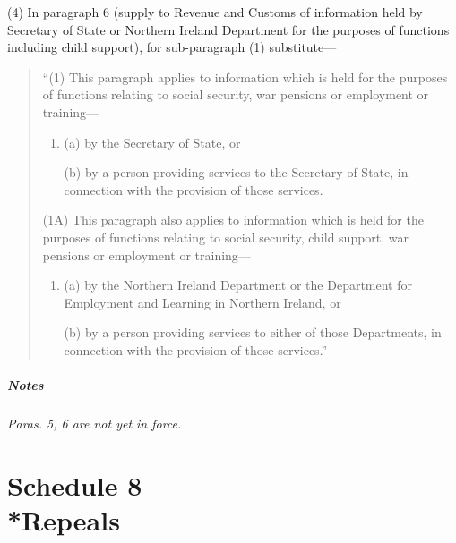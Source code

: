 \documentclass[a4paper]{article}
\newcommand{\parthead}{}
\newcommand\amendment[1]{\subsubsection*{Notes}{\itshape\frenchspacing\footnotesize #1 \par}}
\begin{document}
(4) In paragraph 6 (supply to Revenue and Customs of information held by Secretary of State or Northern Ireland Department for the purposes of functions including child support), for sub-paragraph (1) substitute—
\begin{quotation}
“(1) This paragraph applies to information which is held for the purposes of functions relating to social security, war pensions or employment or training—
\begin{enumerate}\item[]
(a) by the Secretary of State, or

(b) by a person providing services to the Secretary of State, in connection with the provision of those services.
\end{enumerate}

(1A) This paragraph also applies to information which is held for the purposes of functions relating to social security, child support, war pensions or employment or training—
\begin{enumerate}\item[]
(a) by the Northern Ireland Department or the Department for Employment and Learning in Northern Ireland, or

(b) by a person providing services to either of those Departments, in connection with the provision of those services.”
\end{enumerate}
\end{quotation}

\amendment{
Paras. 5, 6 are not yet in force.
}

\part[Schedule 8 --- Repeals]{Schedule 8\\*Repeals}

\renewcommand\parthead{--- Schedule 8}
\end{document}
